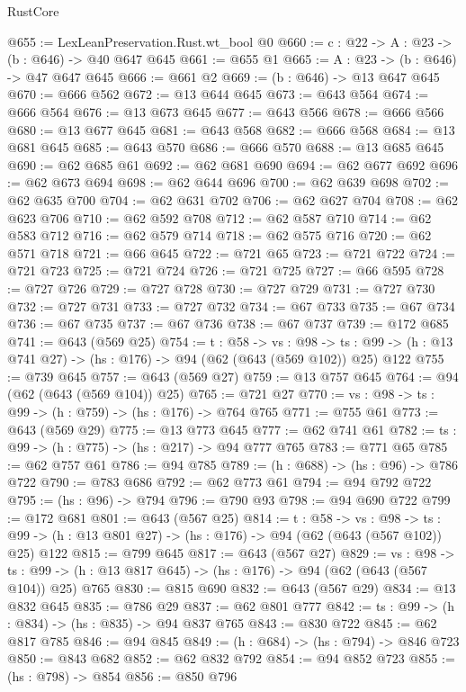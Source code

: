 \begin{lexlean}{RustCore}
\begin{coremodule}
@655 := LexLeanPreservation.Rust.wt_bool @0
@660 := {c : @22} -> {A : @23} -> (b : @646) -> @40 @647 @645
@661 := @655 @1
@665 := {A : @23} -> (b : @646) -> @47 @647 @645
@666 := @661 @2
@669 := (b : @646) -> @13 @647 @645
@670 := @666 @562
@672 := @13 @644 @645
@673 := @643 @564
@674 := @666 @564
@676 := @13 @673 @645
@677 := @643 @566
@678 := @666 @566
@680 := @13 @677 @645
@681 := @643 @568
@682 := @666 @568
@684 := @13 @681 @645
@685 := @643 @570
@686 := @666 @570
@688 := @13 @685 @645
@690 := @62 @685 @61
@692 := @62 @681 @690
@694 := @62 @677 @692
@696 := @62 @673 @694
@698 := @62 @644 @696
@700 := @62 @639 @698
@702 := @62 @635 @700
@704 := @62 @631 @702
@706 := @62 @627 @704
@708 := @62 @623 @706
@710 := @62 @592 @708
@712 := @62 @587 @710
@714 := @62 @583 @712
@716 := @62 @579 @714
@718 := @62 @575 @716
@720 := @62 @571 @718
@721 := @66 @645
@722 := @721 @65
@723 := @721 @722
@724 := @721 @723
@725 := @721 @724
@726 := @721 @725
@727 := @66 @595
@728 := @727 @726
@729 := @727 @728
@730 := @727 @729
@731 := @727 @730
@732 := @727 @731
@733 := @727 @732
@734 := @67 @733
@735 := @67 @734
@736 := @67 @735
@737 := @67 @736
@738 := @67 @737
@739 := @172 @685
@741 := @643 (@569 @25)
@754 := {t : @58} ->
  {vs : @98} ->
  {ts : @99} -> (h : @13 @741 @27) -> (hs : @176) -> @94 (@62 (@643 (@569 @102)) @25) @122
@755 := @739 @645
@757 := @643 (@569 @27)
@759 := @13 @757 @645
@764 := @94 (@62 (@643 (@569 @104)) @25)
@765 := @721 @27
@770 := {vs : @98} -> {ts : @99} -> (h : @759) -> (hs : @176) -> @764 @765
@771 := @755 @61
@773 := @643 (@569 @29)
@775 := @13 @773 @645
@777 := @62 @741 @61
@782 := {ts : @99} -> (h : @775) -> (hs : @217) -> @94 @777 @765
@783 := @771 @65
@785 := @62 @757 @61
@786 := @94 @785
@789 := (h : @688) -> (hs : @96) -> @786 @722
@790 := @783 @686
@792 := @62 @773 @61
@794 := @94 @792 @722
@795 := (hs : @96) -> @794
@796 := @790 @93
@798 := @94 @690 @722
@799 := @172 @681
@801 := @643 (@567 @25)
@814 := {t : @58} ->
  {vs : @98} ->
  {ts : @99} -> (h : @13 @801 @27) -> (hs : @176) -> @94 (@62 (@643 (@567 @102)) @25) @122
@815 := @799 @645
@817 := @643 (@567 @27)
@829 := {vs : @98} ->
  {ts : @99} -> (h : @13 @817 @645) -> (hs : @176) -> @94 (@62 (@643 (@567 @104)) @25) @765
@830 := @815 @690
@832 := @643 (@567 @29)
@834 := @13 @832 @645
@835 := @786 @29
@837 := @62 @801 @777
@842 := {ts : @99} -> (h : @834) -> (hs : @835) -> @94 @837 @765
@843 := @830 @722
@845 := @62 @817 @785
@846 := @94 @845
@849 := (h : @684) -> (hs : @794) -> @846 @723
@850 := @843 @682
@852 := @62 @832 @792
@854 := @94 @852 @723
@855 := (hs : @798) -> @854
@856 := @850 @796

\end{coremodule}
\end{lexlean}
